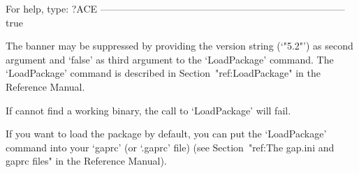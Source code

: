                  For help, type: ?ACE
---------------------------------------------------------------------------
true

\endexample

The banner may be suppressed by providing the version string (`"5.2"')
as second argument and `false' as third argument to the  `LoadPackage'
command.    The    `LoadPackage'    command    is     described     in
Section~"ref:LoadPackage" in the {\GAP} Reference Manual.

If {\GAP} cannot find a working binary, the call to `LoadPackage' will
fail.

If you want to load  the  {\ACE}  package  by   default,  you  can  put
the  `LoadPackage' command into your `gaprc' (or  `.gaprc'  file)  (see
Section~"ref:The gap.ini and gaprc files" in the {\GAP} Reference Manual).


